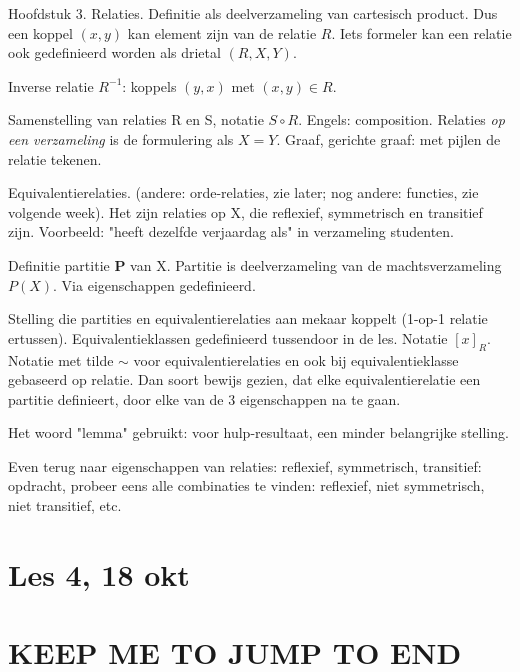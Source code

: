 \documentclass{article}
\begin{document}
Hoofdstuk 3. Relaties. Definitie als deelverzameling van cartesisch product. Dus een koppel $(x,y)$ kan element zijn van de relatie $R$. Iets formeler kan een relatie ook gedefinieerd worden als drietal $(R,X,Y)$. 

Inverse relatie $R^{-1}$: koppels $(y,x)$ met $(x,y) \in R$. 

Samenstelling van relaties R en S, notatie $S \circ R$. Engels: composition. Relaties \emph{op een verzameling} is de formulering als $X=Y$. Graaf, gerichte graaf: met pijlen de relatie tekenen. 

Equivalentierelaties. (andere: orde-relaties, zie later; nog andere: functies, zie volgende week). Het zijn relaties op X, die reflexief, symmetrisch en transitief zijn. Voorbeeld: "heeft dezelfde verjaardag als" in verzameling studenten. 

Definitie partitie $\mathbf{P}$ van X. Partitie is deelverzameling van de machtsverzameling $P(X)$. Via eigenschappen gedefinieerd. 

Stelling die partities en equivalentierelaties aan mekaar koppelt (1-op-1 relatie ertussen). Equivalentieklassen gedefinieerd tussendoor in de les. Notatie $[x]_R$. Notatie met tilde $\sim$ voor equivalentierelaties en ook bij equivalentieklasse gebaseerd op relatie.  Dan soort bewijs gezien, dat elke equivalentierelatie een partitie definieert, door elke van de 3 eigenschappen na te gaan. 

Het woord "lemma" gebruikt: voor hulp-resultaat, een minder belangrijke stelling. 

Even terug naar eigenschappen van relaties: reflexief, symmetrisch, transitief: opdracht, probeer eens alle combinaties te vinden: reflexief, niet symmetrisch, niet transitief, etc. 


\section{Les 4, 18 okt}


\section{KEEP ME TO JUMP TO END}
\end{document}
